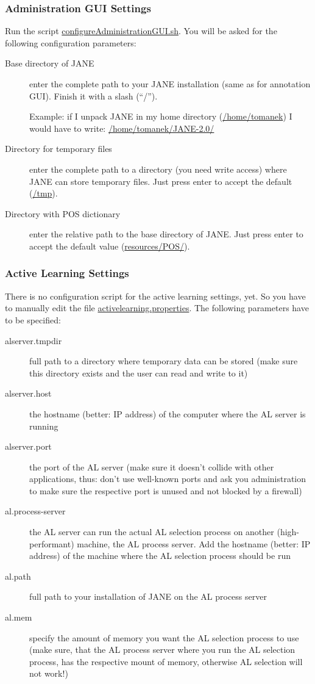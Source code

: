 \documentclass[DIV12,english,11pt,halfparskip]{scrartcl}
\begin{document}
\subsubsection{Administration GUI Settings}
Run the script \url{configureAdministrationGUI.sh}. You will be asked for
the following configuration parameters:

\begin{description}

\item [Base directory of JANE] enter the complete path to your JANE
  installation (same as for annotation GUI). Finish it with a slash
  (``/'').

  Example: if I unpack JANE in my home directory (\url{/home/tomanek})
  I would have to write: \url{/home/tomanek/JANE-2.0/}

\item[Directory for temporary files] enter the complete path to a
  directory (you need write access) where JANE can store
  temporary files. Just press enter to accept the default (\url{/tmp}).

\item[Directory with POS dictionary] enter the relative path to the
  base directory of JANE. Just press enter to accept the default value
  (\url{resources/POS/}).
\end{description}


\subsubsection{Active Learning Settings}
There is no configuration script for the active learning settings,
yet. So you have to manually edit the file
\url{activelearning.properties}. The following parameters have to be
specified:

\begin{description}
\item[alserver.tmpdir] full path to a directory where temporary data
  can be stored (make sure this directory exists and the user can read
  and write to it)
\item[alserver.host] the hostname (better: IP address) of the computer
  where the AL server is running
\item[alserver.port] the port of the AL server (make sure it doesn't
  collide with other applications, thus: don't use well-known ports
  and ask you administration to make sure the respective port is
  unused and not blocked by a firewall)
\item[al.process-server] the AL server can run the actual AL selection
  process on another (high-performant) machine, the AL process server.
  Add the hostname (better: IP address) of the machine where the AL
  selection process should be run
\item[al.path] full path to your installation of JANE on the AL
  process server
\item[al.mem] specify the amount of memory you want the AL selection
  process to use (make sure, that the AL process server where you run the AL
  selection process, has the respective mount of memory, otherwise AL
  selection will not work!)
\end{description}
\end{document}
